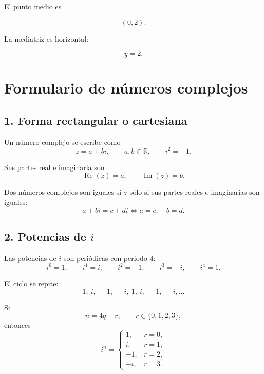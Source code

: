 \documentclass[12pt]{article}
\begin{document}
El punto medio es

\[
(0,2).
\]

La mediatriz es horizontal:

\[
\boxed{y=2}.
\]

\newpage


\section{Formulario de números complejos}

\small

\subsection*{1. Forma rectangular o cartesiana}

Un número complejo se escribe como
\[
\boxed{z=a+bi},
\qquad a,b\in\mathbb{R},
\qquad
\boxed{i^2=-1}.
\]

Sus partes real e imaginaria son
\[
\boxed{\operatorname{Re}(z)=a},
\qquad
\boxed{\operatorname{Im}(z)=b}.
\]

Dos números complejos son iguales si y sólo si sus partes
reales e imaginarias son iguales:
\[
\boxed{
a+bi=c+di
\iff
a=c,\quad b=d.
}
\]

\subsection*{2. Potencias de $i$}

Las potencias de $i$ son periódicas con periodo $4$:
\[
\boxed{
i^0=1,\qquad
i^1=i,\qquad
i^2=-1,\qquad
i^3=-i,\qquad
i^4=1.
}
\]

El ciclo se repite:
\[
1,\ i,\ -1,\ -i,\ 1,\ i,\ -1,\ -i,\ldots
\]

Si
\[
n=4q+r,
\qquad
r\in\{0,1,2,3\},
\]
entonces
\[
\boxed{
i^n=
\begin{cases}
1,  & r=0,\\[2mm]
i,  & r=1,\\[2mm]
-1, & r=2,\\[2mm]
-i, & r=3.
\end{cases}}
\]
\end{document}
